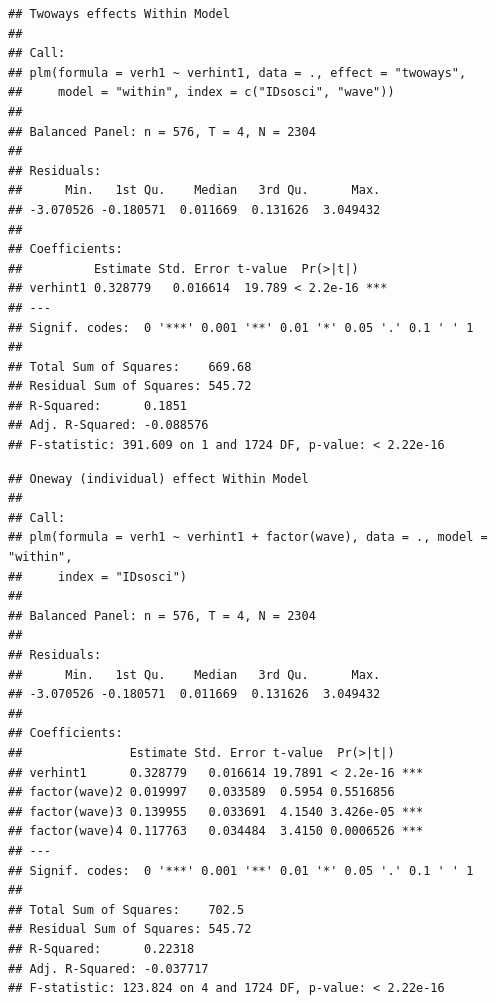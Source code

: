 \documentclass[]{book}
\newenvironment{Shaded}{\begin{snugshade}}{\end{snugshade}}
\newcommand{\DataTypeTok}[1]{\textcolor[rgb]{0.13,0.29,0.53}{#1}}
\newcommand{\KeywordTok}[1]{\textcolor[rgb]{0.13,0.29,0.53}{\textbf{#1}}}
\newcommand{\NormalTok}[1]{#1}
\newcommand{\OperatorTok}[1]{\textcolor[rgb]{0.81,0.36,0.00}{\textbf{#1}}}
\newcommand{\StringTok}[1]{\textcolor[rgb]{0.31,0.60,0.02}{#1}}
\begin{document}
\begin{verbatim}
## Twoways effects Within Model
## 
## Call:
## plm(formula = verh1 ~ verhint1, data = ., effect = "twoways", 
##     model = "within", index = c("IDsosci", "wave"))
## 
## Balanced Panel: n = 576, T = 4, N = 2304
## 
## Residuals:
##      Min.   1st Qu.    Median   3rd Qu.      Max. 
## -3.070526 -0.180571  0.011669  0.131626  3.049432 
## 
## Coefficients:
##          Estimate Std. Error t-value  Pr(>|t|)    
## verhint1 0.328779   0.016614  19.789 < 2.2e-16 ***
## ---
## Signif. codes:  0 '***' 0.001 '**' 0.01 '*' 0.05 '.' 0.1 ' ' 1
## 
## Total Sum of Squares:    669.68
## Residual Sum of Squares: 545.72
## R-Squared:      0.1851
## Adj. R-Squared: -0.088576
## F-statistic: 391.609 on 1 and 1724 DF, p-value: < 2.22e-16
\end{verbatim}

\begin{Shaded}
\end{Shaded}

\begin{verbatim}
## Oneway (individual) effect Within Model
## 
## Call:
## plm(formula = verh1 ~ verhint1 + factor(wave), data = ., model = "within", 
##     index = "IDsosci")
## 
## Balanced Panel: n = 576, T = 4, N = 2304
## 
## Residuals:
##      Min.   1st Qu.    Median   3rd Qu.      Max. 
## -3.070526 -0.180571  0.011669  0.131626  3.049432 
## 
## Coefficients:
##               Estimate Std. Error t-value  Pr(>|t|)    
## verhint1      0.328779   0.016614 19.7891 < 2.2e-16 ***
## factor(wave)2 0.019997   0.033589  0.5954 0.5516856    
## factor(wave)3 0.139955   0.033691  4.1540 3.426e-05 ***
## factor(wave)4 0.117763   0.034484  3.4150 0.0006526 ***
## ---
## Signif. codes:  0 '***' 0.001 '**' 0.01 '*' 0.05 '.' 0.1 ' ' 1
## 
## Total Sum of Squares:    702.5
## Residual Sum of Squares: 545.72
## R-Squared:      0.22318
## Adj. R-Squared: -0.037717
## F-statistic: 123.824 on 4 and 1724 DF, p-value: < 2.22e-16
\end{verbatim}
\end{document}
